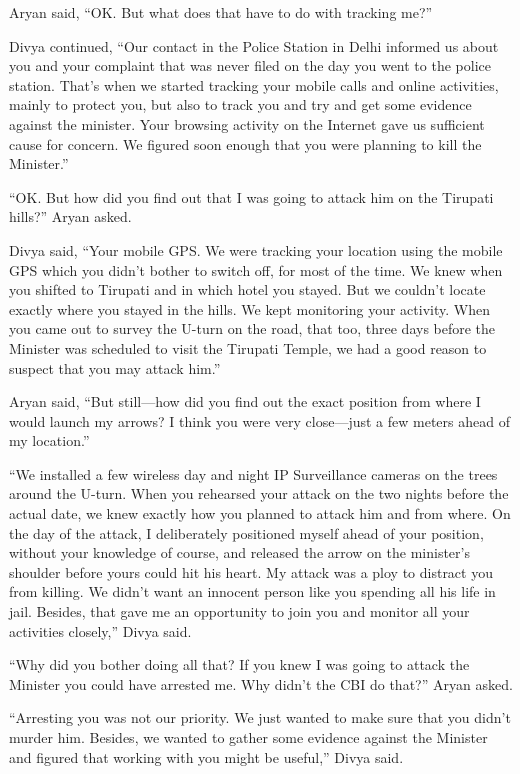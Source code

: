 Aryan said, “OK. But what does that have to do with tracking me?”

Divya continued, “Our contact in the Police Station in Delhi informed us about
you and your complaint that was never filed on the day you went to the police
station. That's when we started tracking your mobile calls and online
activities, mainly to protect you, but also to track you and try and get some
evidence against the minister. Your browsing activity on the Internet gave us
sufficient cause for concern. We figured soon enough that you were planning to
kill the Minister.”

“OK. But how did you find out that I was going to attack him on the Tirupati
hills?” Aryan asked.

Divya said, “Your mobile GPS. We were tracking your location using the mobile
GPS which you didn't bother to switch off, for most of the time. We knew when
you shifted to Tirupati and in which hotel you stayed. But we couldn't locate
exactly where you stayed in the hills. We kept monitoring your activity. When
you came out to survey the U-turn on the road, that too, three days before the
Minister was scheduled to visit the Tirupati Temple, we had a good reason to
suspect that you may attack him.”

Aryan said, “But still—how did you find out the exact position from where I
would launch my arrows? I think you were very close—just a few meters ahead of
my location.”

“We installed a few wireless day and night IP Surveillance cameras on the trees
around the U-turn. When you rehearsed your attack on the two nights before the
actual date, we knew exactly how you planned to attack him and from where. On
the day of the attack, I deliberately positioned myself ahead of your position,
without your knowledge of course, and released the arrow on the minister's
shoulder before yours could hit his heart. My attack was a ploy to distract you
from killing. We didn't want an innocent person like you spending all his life
in jail. Besides, that gave me an opportunity to join you and monitor all your
activities closely,” Divya said.

“Why did you bother doing all that? If you knew I was going to attack the
Minister you could have arrested me. Why didn't the CBI do that?” Aryan asked.

“Arresting you was not our priority. We just wanted to make sure that you didn't
murder him. Besides, we wanted to gather some evidence against the Minister and
figured that working with you might be useful,” Divya said.

